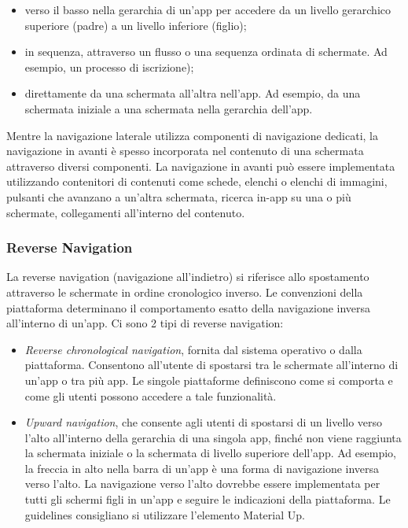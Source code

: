 \documentclass[12pt, a4paper]{report}
\begin{document}
    			\begin{itemize}
    				\item verso il basso nella gerarchia di un'app per accedere da un livello gerarchico superiore (padre) a un livello inferiore (figlio);
    				\item in sequenza, attraverso un flusso o una sequenza ordinata di schermate. Ad esempio, un processo di iscrizione);
    				\item direttamente da una schermata all'altra nell'app. Ad esempio, da una schermata iniziale a una schermata nella gerarchia dell'app.
    			\end{itemize}

    			Mentre la navigazione laterale utilizza componenti di navigazione dedicati, la navigazione in avanti è spesso incorporata nel contenuto di una schermata attraverso
    			 diversi componenti. La navigazione in avanti può essere implementata utilizzando contenitori di contenuti come schede, elenchi o elenchi di immagini, pulsanti che avanzano
    			 a un'altra schermata, ricerca in-app su una o più schermate, collegamenti all'interno del contenuto.


    			\subsubsection{Reverse Navigation}
    			La reverse navigation (navigazione all'indietro) si riferisce allo spostamento attraverso le schermate in ordine cronologico inverso. Le convenzioni della piattaforma
    			determinano il comportamento esatto della navigazione inversa all'interno di un'app. Ci sono 2 tipi di reverse navigation:
    			\begin{itemize}
    				\item \textit{Reverse chronological navigation}, fornita dal sistema operativo o dalla piattaforma. Consentono all’utente di spostarsi tra le schermate all'interno di un'app
    				o tra più app. Le singole piattaforme definiscono come si comporta e come gli utenti possono accedere a tale funzionalità.
    				\item \textit{Upward navigation}, che consente agli utenti di spostarsi di un livello verso l'alto all'interno della gerarchia di una singola app, finché non viene raggiunta la
    				schermata iniziale o la schermata di livello superiore dell'app. Ad esempio, la freccia in alto nella barra di un'app è una forma di navigazione inversa verso l'alto.
    				La navigazione verso l'alto dovrebbe essere implementata per tutti gli schermi figli  in un'app e seguire le indicazioni della piattaforma. Le guidelines consigliano si utilizzare
    				l'elemento Material Up.
    			\end{itemize}
\end{document}
